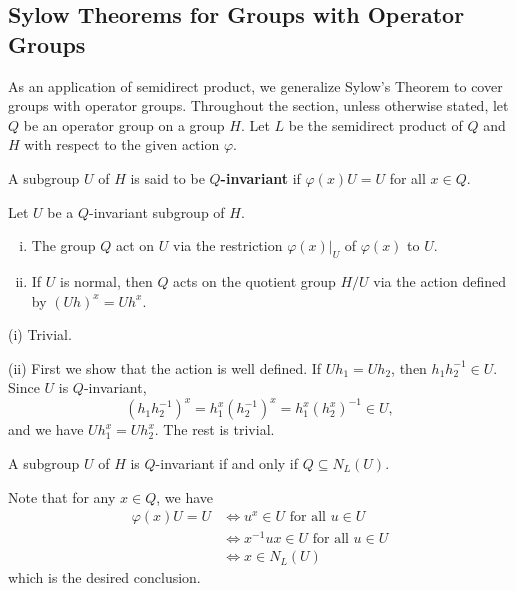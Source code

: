 \subsection{Sylow Theorems for Groups with Operator Groups}
As an application of semidirect product, we generalize Sylow's Theorem to cover groups with operator groups. 
 Throughout the section, unless otherwise stated, let $Q$ be an operator group on a group $H$. Let $L$ be the semidirect product of $Q$ and $H$ with respect to the given action $\varphi$. 
\begin{definition}
	A subgroup $U$ of $H$ is said to be \textbf{$Q$-invariant} if $\varphi(x)U = U$ for all $x\in Q$.
\end{definition}
\begin{proposition} \label{prop-Q-act-on-invariant-subgroup}
	 Let $U$ be a $Q$-invariant subgroup of $H$. 
	\begin{enumerate}[(i)]
		\item The group $Q$ act on $U$ via  the restriction $\varphi(x)|_{U}$ of $\varphi(x)$ to $U$.
		\item If $U$ is normal, then $Q$ acts on the quotient group $H/U$ via the action defined by $(Uh)^x = Uh^x$.
	\end{enumerate}
	\begin{sketch}
		(i) Trivial.
		
		(ii) First we show that the action is well defined. If $Uh_1 = Uh_2$, then $h_1h_2^{-1} \in U$. Since $U$ is $Q$-invariant,
		$$(h_1h_2^{-1})^x = h_1^x(h_2^{-1})^x = h_1^x(h_2^x)^{-1} \in U,$$
		and we have $Uh_1^x = Uh_2^x$. %
		The rest is trivial.
	\end{sketch}
\end{proposition}
\begin{lemma} \label{lemma-operator-group-invariant-eqv}
	A subgroup $U$ of $H$ is $Q$-invariant if and only if $Q \subseteq N_L(U)$.
\end{lemma}
\begin{sketch}
	Note that for any $x\in Q$, we have
	\begin{align*}
		\varphi(x) U = U &\iff u^x \in U \text{ for all } u\in U
		\\
		&\iff x^{-1}ux\in U \text{ for all } u\in U
		\\
		&\iff x\in N_L(U)
	\end{align*}
	which is the desired conclusion.
\end{sketch}

